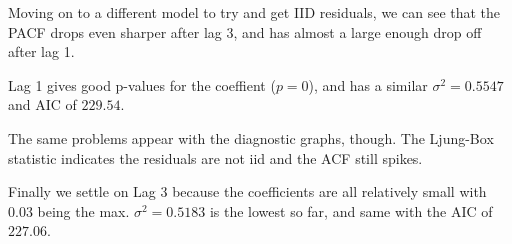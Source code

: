 \nl Moving on to a different model to try and get IID residuals, we can see that the PACF drops even sharper after lag 3, and has almost a large enough drop off after lag 1.

\nl Lag 1 gives good p-values for the coeffient ($p=0$), and has a similar $\sigma^2 = 0.5547$ and AIC of $229.54$. 

\nl The same problems appear with the diagnostic graphs, though. The Ljung-Box statistic indicates the residuals are not iid and the ACF still spikes. 


\nl Finally we settle on Lag 3 because the coefficients are all relatively small with 0.03 being the  max. $\sigma^2 = 0.5183$ is the lowest so far, and same with the AIC of $227.06$. 

